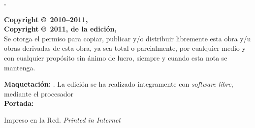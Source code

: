 \noindent
\textbf{\titlename. \subtitlename}\\
\authorname

\bigskip\bigskip\footnotesize\noindent
\textbf{Copyright \copyright\ 2010--2011, \authorname}\\
\textbf{Copyright \copyright\ 2011, de la edición, \editorname}\\
Se otorga el permiso para copiar, publicar y/o distribuir libremente esta obra y/u obras derivadas de esta obra, ya sea total o parcialmente, por cualquier medio y con cualquier propósito sin ánimo de lucro, siempre y cuando esta nota se mantenga.

\bigskip\noindent
\textbf{Maquetación:} \editorname. La edición se ha realizado íntegramente con \emph{software libre}, mediante el procesador \emph{\LaTeXe}\\
\textbf{Portada:} \coverauthorname

\bigskip\noindent
Impreso en la Red. \emph{Printed in Internet}
\normalsize
{}

\endinput
